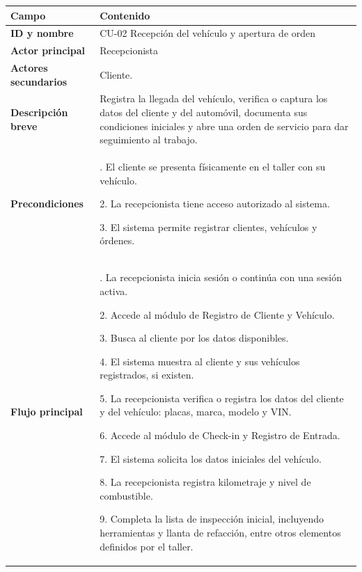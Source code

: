 {\def\LTcaptype{none} %
\begin{longtable}[]{@{}
  >{\raggedright\arraybackslash}p{}
  >{\raggedright\arraybackslash}p{}@{}}
\toprule\noalign{}
\begin{minipage}[b]{\linewidth}\raggedright
\textbf{Campo}
\end{minipage} & \begin{minipage}[b]{\linewidth}\raggedright
\textbf{Contenido}
\end{minipage} \\
\midrule\noalign{}
\endhead
\bottomrule\noalign{}
\endlastfoot
\textbf{ID y nombre} & CU-02 Recepción del vehículo y apertura de
orden \\
\textbf{Actor principal} & Recepcionista \\
\textbf{Actores secundarios} & Cliente. \\
\textbf{Descripción breve} & Registra la llegada del vehículo, verifica
o captura los datos del cliente y del automóvil, documenta sus
condiciones iniciales y abre una orden de servicio para dar seguimiento
al trabajo. \\
\textbf{Precondiciones} & 1. El cliente se presenta físicamente en el
taller con su vehículo.

2. La recepcionista tiene acceso autorizado al sistema.

3. El sistema permite registrar clientes, vehículos y órdenes. \\
\textbf{Flujo principal} & 1. La recepcionista inicia sesión o continúa
con una sesión activa.

2. Accede al módulo de Registro de Cliente y Vehículo.

3. Busca al cliente por los datos disponibles.

4. El sistema muestra al cliente y sus vehículos registrados, si
existen.

5. La recepcionista verifica o registra los datos del cliente y del
vehículo: placas, marca, modelo y VIN.

6. Accede al módulo de Check-in y Registro de Entrada.

7. El sistema solicita los datos iniciales del vehículo.

8. La recepcionista registra kilometraje y nivel de combustible.

9. Completa la lista de inspección inicial, incluyendo herramientas y
llanta de refacción, entre otros elementos definidos por el taller.


\end{longtable}}
